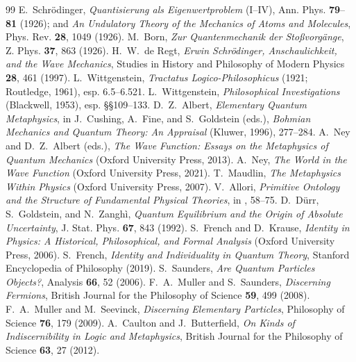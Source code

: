 \documentclass[11pt]{article}
\begin{document}
\begin{thebibliography}{99}
 E.~Schr\"odinger, \emph{Quantisierung als Eigenwertproblem} (I--IV), Ann.
Phys. \textbf{79}--\textbf{81} (1926); and \emph{An Undulatory Theory of the Mechanics of Atoms and
Molecules}, Phys. Rev. \textbf{28}, 1049 (1926).
 M.~Born, \emph{Zur Quantenmechanik der Sto\ss vorg\"ange}, Z. Phys. \textbf{37}, 863
(1926).
 H.~W.~de Regt, \emph{Erwin Schr\"odinger, Anschaulichkeit, and the Wave Mechanics},
Studies in History and Philosophy of Modern Physics \textbf{28}, 461 (1997).
 L.~Wittgenstein, \emph{Tractatus Logico-Philosophicus} (1921; Routledge, 1961),
esp. 6.5--6.521.
 L.~Wittgenstein, \emph{Philosophical Investigations} (Blackwell, 1953), esp.
\S\S109--133.
 D.~Z.~Albert, \emph{Elementary Quantum Metaphysics}, in J.~Cushing, A.~Fine, and
S.~Goldstein (eds.), \emph{Bohmian Mechanics and Quantum Theory: An Appraisal} (Kluwer, 1996), 277--284.
 A.~Ney and D.~Z.~Albert (eds.), \emph{The Wave Function: Essays on the Metaphysics
of Quantum Mechanics} (Oxford University Press, 2013).
 A.~Ney, \emph{The World in the Wave Function} (Oxford University Press, 2021).
 T.~Maudlin, \emph{The Metaphysics Within Physics} (Oxford University Press, 2007).
 V.~Allori, \emph{Primitive Ontology and the Structure of Fundamental Physical
Theories}, in \cite{NeyAlbert2013}, 58--75.
 D.~D\"urr, S.~Goldstein, and N.~Zangh\`i, \emph{Quantum Equilibrium and the Origin of
Absolute Uncertainty}, J. Stat. Phys. \textbf{67}, 843 (1992).
 S.~French and D.~Krause, \emph{Identity in Physics: A Historical, Philosophical,
and Formal Analysis} (Oxford University Press, 2006).
 S.~French, \emph{Identity and Individuality in Quantum Theory}, Stanford Encyclopedia
of Philosophy (2019).
 S.~Saunders, \emph{Are Quantum Particles Objects?}, Analysis \textbf{66}, 52 (2006).
 F.~A.~Muller and S.~Saunders, \emph{Discerning Fermions}, British Journal for
the Philosophy of Science \textbf{59}, 499 (2008).
 F.~A.~Muller and M.~Seevinck, \emph{Discerning Elementary Particles},
Philosophy of Science \textbf{76}, 179 (2009).
 A.~Caulton and J.~Butterfield, \emph{On Kinds of Indiscernibility in Logic
and Metaphysics}, British Journal for the Philosophy of Science \textbf{63}, 27 (2012).

\end{thebibliography}
\end{document}
